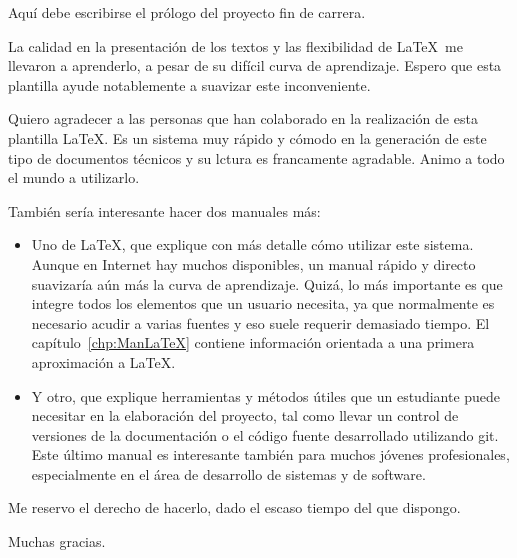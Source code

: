 


Aquí debe escribirse el prólogo del proyecto fin de carrera.

\medskip

La calidad en la presentación de los textos y las flexibilidad de \LaTeX\ me llevaron a aprenderlo, a pesar de su difícil curva de aprendizaje.
Espero que esta plantilla ayude notablemente a suavizar este inconveniente.

Quiero agradecer a las personas que han colaborado en la realización de esta plantilla \LaTeX. Es un sistema muy rápido y cómodo en la generación de este tipo de documentos técnicos y su lctura es francamente agradable. Animo a todo el mundo a utilizarlo.

También sería interesante hacer dos manuales más:

\begin{itemize}

	\item Uno de \LaTeX, que explique con más detalle cómo utilizar este sistema. Aunque en Internet hay muchos disponibles, un manual rápido y directo suavizaría aún más la curva de aprendizaje. Quizá, lo más importante es que integre todos los elementos que un usuario necesita, ya que normalmente es necesario acudir a varias fuentes y eso suele requerir demasiado tiempo.	El capítulo~\ref{chp:ManLaTeX} contiene información orientada a una primera aproximación a \LaTeX.

	\item Y otro, que explique herramientas y métodos útiles que un estudiante puede necesitar en la elaboración del proyecto, tal como llevar un control de versiones de la documentación o el código fuente desarrollado utilizando git. Este último manual es interesante también para muchos jóvenes profesionales, especialmente en el área de desarrollo de sistemas y de software.

\end{itemize}

	Me reservo el derecho de hacerlo, dado el escaso tiempo del que dispongo.
	\bigskip

	Muchas gracias.

\chapterend

